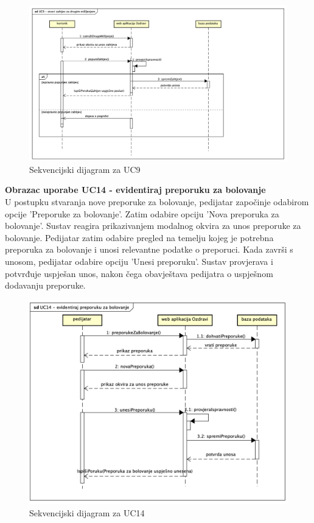 				\begin{figure}[H]
						\includegraphics[width=\textwidth]{slike/sduc9.png} 
						\caption{Sekvencijski dijagram za UC9}
				\end{figure}
				\eject

				\noindent\textbf{Obrazac uporabe UC14 - evidentiraj preporuku za bolovanje}\\
				U postupku stvaranja nove preporuke za bolovanje, pedijatar započinje odabirom opcije 'Preporuke za bolovanje'.
				Zatim odabire opciju 'Nova preporuka za bolovanje'. Sustav reagira prikazivanjem modalnog 
				okvira za unos preporuke za bolovanje. Pedijatar zatim odabire pregled na temelju kojeg 
				je potrebna preporuka za bolovanje i unosi relevantne podatke o preporuci. Kada završi 
				s unosom, pedijatar odabire opciju 'Unesi preporuku'. Sustav provjerava i potvrđuje 
				uspješan unos, nakon čega obavještava pedijatra o uspješnom dodavanju preporuke. \\

				\begin{figure}[H]
						\includegraphics[width=\textwidth]{slike/sduc14.png} 
						\caption{Sekvencijski dijagram za UC14}
				\end{figure}
				\eject
				
